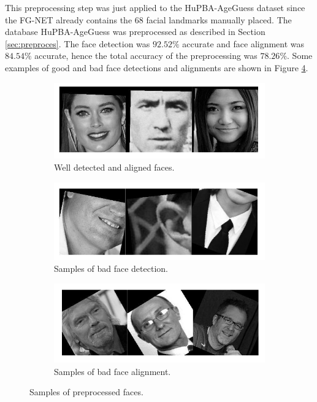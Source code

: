 This preprocessing step was just applied to the HuPBA-AgeGuess dataset since the FG-NET already contains the 68 facial landmarks manually placed. The database HuPBA-AgeGuess was preprocessed as described in Section \ref{sec:preproces}. The face detection was $92.52\%$ accurate and face alignment was $84.54\%$ accurate, hence the total accuracy of the preprocessing was $78.26\%$. Some examples of good and bad face detections and alignments are shown in Figure \ref{fig:sampPP}.

\begin{figure}
	\centering
	\begin{subfigure}[b]{\textwidth}
		\includegraphics[width=\textwidth]{figures/good_pp}
		\caption{Well detected and aligned faces.}
		\label{fig:goodPP}
	\end{subfigure}%
	
	\begin{subfigure}[b]{\textwidth}
		\includegraphics[width=\textwidth]{figures/bad_detection}
		\caption{Samples of bad face detection.}
		\label{fig:badDet}
	\end{subfigure}
	
	\begin{subfigure}[b]{\textwidth}
		\includegraphics[width=\textwidth]{figures/bad_alignment}
		\caption{Samples of bad face alignment.}
		\label{fig:badAl}
	\end{subfigure}
	\caption{Samples of preprocessed faces.}\label{fig:sampPP}
\end{figure}

